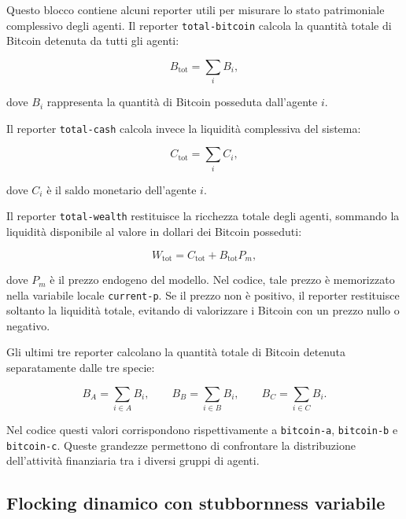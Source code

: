 Questo blocco contiene alcuni reporter utili per misurare lo stato patrimoniale
complessivo degli agenti. Il reporter \texttt{total-bitcoin} calcola la quantità
totale di Bitcoin detenuta da tutti gli agenti:

\[
B_{\mathrm{tot}}=\sum_i B_i,
\]

dove \(B_i\) rappresenta la quantità di Bitcoin posseduta dall'agente \(i\).

Il reporter \texttt{total-cash} calcola invece la liquidità complessiva del
sistema:

\[
C_{\mathrm{tot}}=\sum_i C_i,
\]

dove \(C_i\) è il saldo monetario dell'agente \(i\).

Il reporter \texttt{total-wealth} restituisce la ricchezza totale degli agenti,
sommando la liquidità disponibile al valore in dollari dei Bitcoin posseduti:

\[
W_{\mathrm{tot}}
=
C_{\mathrm{tot}}
+
B_{\mathrm{tot}}P_m,
\]

dove \(P_m\) è il prezzo endogeno del modello. Nel codice, tale prezzo è
memorizzato nella variabile locale \texttt{current-p}. Se il prezzo non è
positivo, il reporter restituisce soltanto la liquidità totale, evitando di
valorizzare i Bitcoin con un prezzo nullo o negativo.

Gli ultimi tre reporter calcolano la quantità totale di Bitcoin detenuta
separatamente dalle tre specie:

\[
B_A = \sum_{i \in A} B_i,
\qquad
B_B = \sum_{i \in B} B_i,
\qquad
B_C = \sum_{i \in C} B_i.
\]

Nel codice questi valori corrispondono rispettivamente a \texttt{bitcoin-a},
\texttt{bitcoin-b} e \texttt{bitcoin-c}. Queste grandezze permettono di
confrontare la distribuzione dell'attività finanziaria tra i diversi gruppi di
agenti.

\subsection{Flocking dinamico con stubbornness variabile}

